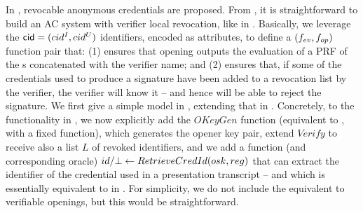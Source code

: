 In \cite{cks10}, revocable anonymous credentials are proposed. From \CUASGen, it
is straightforward to build an AC system with verifier local revocation, like in
\cite{bs04}. Basically, we leverage the $\mathsf{cid}=(cid^I,cid^U)$ identifiers,
encoded as attributes, to define a $(f_{ev},f_{op})$ function pair that: (1)
ensures that opening outputs the evaluation of a PRF of the {\cid}s concatenated
with the verifier name; and (2) ensures that, if some {\cid} of the credentials
used to produce a signature have been added to a revocation list by the
verifier, the verifier will know it -- and hence will be able to reject the
signature. We first give a simple model in
, extending that in .
Concretely, to the functionality in , we now
explicitly add
the $OKeyGen$ function (equivalent to \OKeyGen, with a fixed \finsp function),
which generates the opener key pair, extend $Verify$ to receive also a list $L$
of revoked identifiers, and we add a function (and corresponding oracle) $id/\bot
\gets RetrieveCredId(osk,reg)$ that can extract the identifier of the
credential used in a presentation transcript \utrans -- and which is essentially
equivalent to \Open in \UAS. For simplicity, we do not include the equivalent to
verifiable openings, but this would be straightforward.

